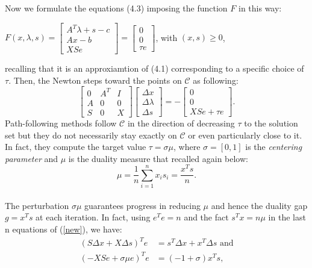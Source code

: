 \documentclass[a4paper,10 pt,titlepage,twoside]{book}
\theoremstyle{plain}
\theoremstyle{definition}
\theoremstyle{remark}
\begin{document}
 Now we formulate the equations (4.3) imposing the function $\mathit{F}$ in this way:
 \begin{center}
 	$\mathit{F}(x,\lambda,s)= \begin{bmatrix}
 	A^{T}\lambda+s-c \\Ax-b \\XSe
 	\end{bmatrix}=\begin{bmatrix} 0\\0\\ \tau e \end{bmatrix}$, with $(x,s)\geq0$,
 \end{center}
recalling that it is an approxiamtion of (4.1) corresponding
to a specific choice of $\tau$. Then, the Newton steps toward the points on $\mathcal{C}$ as following:
 \begin{equation}\label{new}\tag{4.5}
 \begin{bmatrix}
 0&A^{T}&I \\A&0&0\\S&0&X
 \end{bmatrix}\begin{bmatrix}
 \Delta x\\\Delta\lambda \\\Delta s
 \end{bmatrix}=-\begin{bmatrix}
 0\\0\\XSe + \tau e
 \end{bmatrix}.
 \end{equation}
 Path-following methods follow $\mathcal{C}$ in the direction of decreasing $\tau$ to the solution set but they do not necessarily stay exactly on $\mathcal{C}$ or even particularly close to it. In fact, they compute the target value $\tau = \sigma \mu$, where $\sigma = [0,1]$ is the \textit{centering parameter} and $\mu$ is the duality measure that recalled again below:
 \begin{equation}\label{eq:dm}\tag{4.6}
 \mu = \frac{1}{n}\sum_{i=1}^{n} x_{i}s_{i} = \frac{x^{T}s}{n}.
 \end{equation}\\
 The perturbation $\sigma\mu$ guarantees progress in reducing $\mu$ and hence the duality gap $g = x^{T}s$ at each iteration.
In fact, using $e^{T}e= n$ and the fact $s^{T}x=n\mu$ in the last n equations of (\ref{new}), we have:
 \begin{align*}
 (S\Delta x + X\Delta s)^{T}e &= s^{T}\Delta x + x^{T}\Delta s \text{ and}\\
  (- XSe + \sigma \mu e)^{T}e &= (-1 + \sigma)x^{T}s,
 \end{align*}
\end{document}
